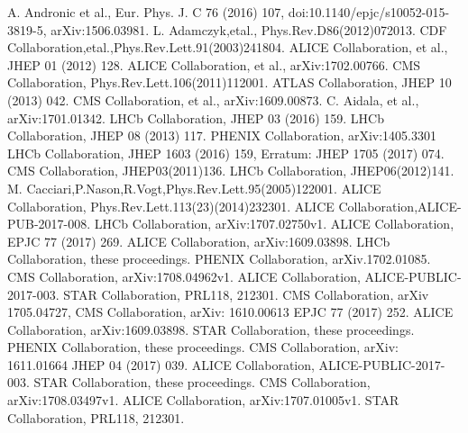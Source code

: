 \documentclass{webofc}
\begin{document}
\begin{thebibliography}{}
 A. Andronic et al., Eur. Phys. J. C 76 (2016) 107, doi:10.1140/epjc/s10052-015-3819-5, arXiv:1506.03981. 
 L. Adamczyk,etal., Phys.Rev.D86(2012)072013.
 CDF Collaboration,etal.,Phys.Rev.Lett.91(2003)241804.
 ALICE Collaboration, et al., JHEP 01 (2012) 128.
 ALICE Collaboration, et al., arXiv:1702.00766.
 CMS Collaboration, Phys.Rev.Lett.106(2011)112001.
 ATLAS Collaboration, JHEP 10 (2013) 042.
 CMS Collaboration, et al., arXiv:1609.00873.
 C. Aidala, et al., arXiv:1701.01342.
 LHCb Collaboration, JHEP 03 (2016) 159.
 LHCb Collaboration, JHEP 08 (2013) 117.
 PHENIX Collaboration, arXiv:1405.3301
 LHCb Collaboration, JHEP 1603 (2016) 159, Erratum: JHEP 1705 (2017) 074.
 CMS Collaboration, JHEP03(2011)136.
 LHCb Collaboration, JHEP06(2012)141.
 M. Cacciari,P.Nason,R.Vogt,Phys.Rev.Lett.95(2005)122001.
 ALICE Collaboration, Phys.Rev.Lett.113(23)(2014)232301. 
 ALICE Collaboration,ALICE-PUB-2017-008. 
 LHCb Collaboration, arXiv:1707.02750v1.
 ALICE Collaboration, EPJC 77 (2017) 269.
 ALICE Collaboration, arXiv:1609.03898.
 LHCb Collaboration, these proceedings.
 PHENIX Collaboration, arXiv.1702.01085.
 CMS Collaboration, arXiv:1708.04962v1.
 ALICE Collaboration, ALICE-PUBLIC-2017-003.
 STAR Collaboration, PRL118, 212301.
 CMS Collaboration, arXiv 1705.04727,
 CMS Collaboration, arXiv: 1610.00613 EPJC 77 (2017) 252.
 ALICE Collaboration, arXiv:1609.03898.
 STAR Collaboration, these proceedings.
 PHENIX Collaboration, these proceedings.
 CMS Collaboration, arXiv: 1611.01664 JHEP 04 (2017) 039.
 ALICE Collaboration, ALICE-PUBLIC-2017-003.
 STAR Collaboration, these proceedings.
 CMS Collaboration, arXiv:1708.03497v1.
 ALICE Collaboration, arXiv:1707.01005v1.
 STAR Collaboration, PRL118, 212301.

\end{thebibliography}
\end{document}
